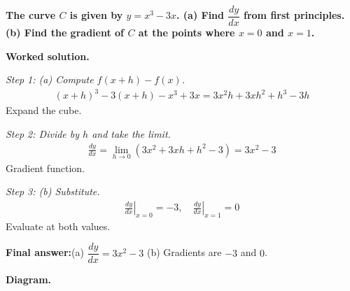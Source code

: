 \documentclass[11pt]{article}
\newcommand{\question}[1]{\par\medskip\noindent\textbf{#1}\par}
\begin{document}
\question{The curve \( C \) is given by \( y = x^3 - 3x \). (a) Find \( \dfrac{dy}{dx} \) from first principles. (b) Find the gradient of \( C \) at the points where \( x = 0 \) and \( x = 1 \).}

\textbf{Worked solution.}

\textit{Step 1: (a) Compute \( f(x+h) - f(x) \).}
\[\begin{gathered}
(x+h)^3 - 3(x+h) - x^3 + 3x = 3x^2h + 3xh^2 + h^3 - 3h
\end{gathered}\]
Expand the cube.

\textit{Step 2: Divide by \( h \) and take the limit.}
\[\begin{gathered}
\frac{dy}{dx} = \lim_{h \to 0}(3x^2 + 3xh + h^2 - 3) = 3x^2 - 3
\end{gathered}\]
Gradient function.

\textit{Step 3: (b) Substitute.}
\[\begin{gathered}
\left.\frac{dy}{dx}\right|_{x=0} = -3, \quad \left.\frac{dy}{dx}\right|_{x=1} = 0
\end{gathered}\]
Evaluate at both values.

\begin{answerbox}
\textbf{Final answer:}\quad (a) \(\displaystyle  \dfrac{dy}{dx} = 3x^2 - 3 \) \quad  (b) Gradients are \(\displaystyle  -3 \) and \(\displaystyle  0 \).
\end{answerbox}
\textbf{Diagram.}
\end{document}
